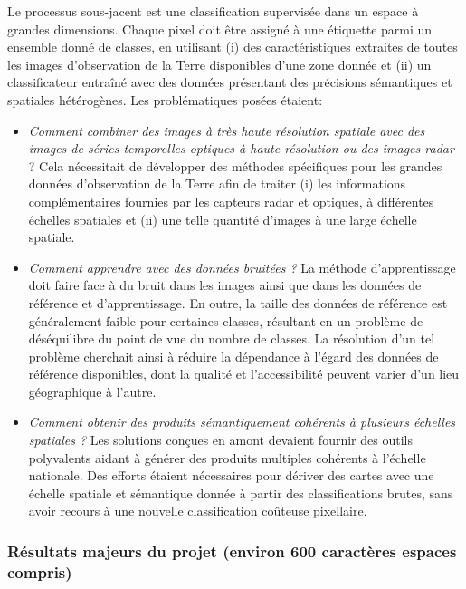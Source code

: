 Le processus sous-jacent est une classification supervisée dans un espace à grandes dimensions. Chaque pixel doit être assigné à une étiquette parmi un ensemble donné de classes, en utilisant (i) des caractéristiques extraites de toutes les images d'observation de la Terre disponibles d'une zone donnée et (ii) un classificateur entraîné avec des données présentant des précisions sémantiques et spatiales hétérogènes. Les problématiques posées étaient: 
\begin{itemize}
\item \textit{Comment combiner des images à très haute résolution spatiale avec des images de séries temporelles optiques à haute résolution ou des images radar} ? Cela nécessitait de développer des méthodes spécifiques pour les grandes données d'observation de la Terre afin de traiter (i) les informations complémentaires fournies par les capteurs radar et optiques, à différentes échelles spatiales et (ii) une telle quantité d'images à une large échelle spatiale.
\item \textit{Comment apprendre avec des données bruitées ?} La méthode d'apprentissage doit faire face à
du bruit dans les images ainsi que dans les données de référence et d’apprentissage. 
En outre, la taille des données de référence est généralement faible pour certaines classes, résultant en un problème de déséquilibre du point de vue du nombre de classes. La résolution d'un tel problème cherchait ainsi à réduire la dépendance à l'égard des données de référence disponibles, dont la qualité et l'accessibilité peuvent varier d'un lieu géographique à l'autre.
\item \textit{Comment obtenir des produits sémantiquement cohérents à plusieurs échelles spatiales ?} Les solutions conçues en amont devaient fournir des outils polyvalents aidant à générer des produits multiples cohérents à l'échelle nationale. Des efforts étaient nécessaires pour dériver des cartes avec une échelle spatiale et sémantique donnée à partir des classifications brutes, sans avoir recours à une nouvelle classification coûteuse pixellaire.

\end{itemize}

\subsubsection*{Résultats majeurs du projet (environ 600 caractères espaces compris)}

